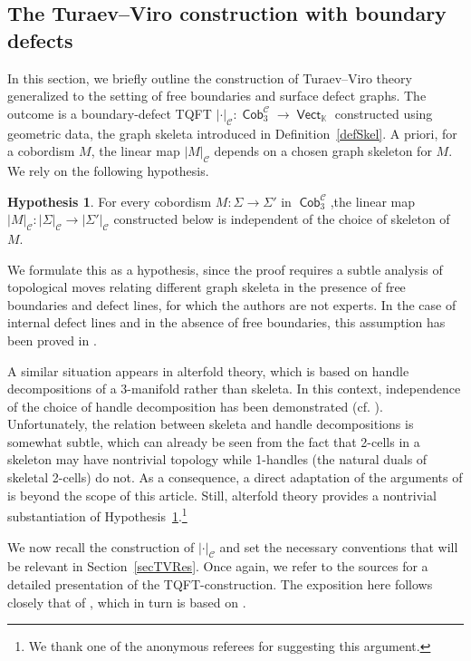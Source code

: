 \documentclass[10pt,a4paper]{amsart}
\DeclareMathOperator{\vect}{\mathsf{Vect}}
\DeclareMathOperator{\K}{\mathbb{K}}
\DeclareMathOperator{\Cob}{\mathsf{Cob}}
\DeclareMathOperator{\calc}{\mathcal{C}}
\numberwithin{equation}{section}
\theoremstyle{definition}
\newtheorem{Hypothesis}[Hypothesis]{Hypothesis}
\begin{document}
\subsection{The Turaev--Viro construction with boundary defects}
\label{subSecTV}
In this section, we briefly outline the construction of Turaev--Viro theory generalized to the setting of free boundaries and surface defect graphs. The outcome is a boundary-defect TQFT $|\cdot|_{\calc}\colon \Cob_3^{\calc} \rightarrow \vect_{\K}$ constructed using geometric data, the graph skeleta introduced in Definition~\ref{defSkel}. A priori, for a cobordism $M$, the linear map $|M|_{\calc}$ depends on a chosen graph skeleton for $M$. We rely on the following hypothesis.
\begin{Hypothesis}
 \label{hyp}
 For every cobordism $M\colon \Sigma \rightarrow \Sigma'$ in $\Cob_3^{\calc}$,the linear map $|M|_{\calc}\colon |\Sigma|_{\calc} \rightarrow |\Sigma'|_{\calc}$ constructed below is independent of the choice of skeleton of $M$.
\end{Hypothesis}
We formulate this as a hypothesis, since the proof requires a subtle analysis of topological moves relating different graph skeleta in the presence of free boundaries and defect lines, for which the authors are not experts. In the case of internal defect lines and in the absence of free boundaries, this assumption has been proved in \cite[Theorems~15.7 and~15.8]{TV}.

A similar situation appears in alterfold theory, which is based
on handle decompositions of a 3\nobreakdash-manifold rather than skeleta. In this context,
independence of the choice of handle decomposition has been demonstrated
(cf. \cite[Theorems~3.9 and~3.21, Remark~3.22]{LMWW}). Unfortunately, the
relation between skeleta and handle decompositions is somewhat subtle, which can
already be seen from the fact that 2-cells in a skeleton may have nontrivial topology while
1-handles (the natural duals of skeletal 2-cells) do not. As a consequence, a direct adaptation of the arguments
of \cite{LMWW} is beyond the scope of this article. Still, alterfold
theory provides a nontrivial substantiation of Hypothesis~\ref{hyp}.\footnote{We thank one of the anonymous referees for suggesting this argument.}

We now recall the construction of $|\cdot|_{\calc}$ and set the necessary conventions that will be relevant in Section~\ref{secTVRes}. Once again, we refer to the sources \cite{TV, FS} for a detailed presentation of the TQFT-construction. The exposition here follows closely that of \cite{F}, which in turn is based on \cite[Chapters 12--15]{TV}.
\end{document}
